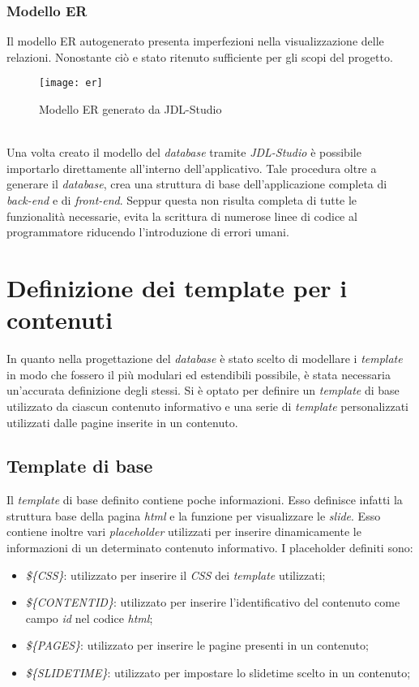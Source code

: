 \subsubsection{Modello ER}
Il modello ER autogenerato presenta imperfezioni nella visualizzazione delle relazioni. Nonostante ciò e stato ritenuto sufficiente per gli scopi del progetto.
\begin{figure}[h]
    \begin{center}
    \texttt{[image: er]}
    \caption{Modello ER generato da JDL-Studio}
    \label{fig:figure19}
    \end{center}
\end{figure}
\\Una volta creato il modello del \textit{database} tramite \textit{JDL-Studio} è possibile importarlo direttamente all'interno dell'applicativo.
Tale procedura oltre a generare il \textit{database}, crea una struttura di base dell'applicazione completa di \textit{back-end} e di \textit{front-end}. Seppur questa non risulta completa di tutte le funzionalità necessarie, evita la scrittura di numerose linee di codice al programmatore riducendo l'introduzione di errori umani.
\section{Definizione dei template per i contenuti}
In quanto nella progettazione del \textit{database} è stato scelto di modellare i \textit{template} in modo che fossero il più modulari ed estendibili possibile, è stata necessaria un'accurata definizione degli stessi. Si è optato per definire un \textit{template} di base utilizzato da ciascun contenuto informativo e una serie di \textit{template} personalizzati utilizzati dalle pagine inserite in un contenuto.
\subsection{Template di base}
Il \textit{template} di base definito contiene poche informazioni. Esso definisce infatti la struttura base della pagina \textit{html} e la funzione per visualizzare le \textit{slide}. Esso contiene inoltre vari \textit{placeholder} utilizzati per inserire dinamicamente le informazioni di un determinato contenuto informativo.
I placeholder definiti sono: 
\begin{itemize}
    \item \textit{\$\{CSS\}}: utilizzato per inserire il \textit{CSS} dei \textit{template} utilizzati;
    \item \textit{\$\{CONTENTID\}}: utilizzato per inserire l’identificativo del contenuto come campo \textit{id} nel codice \textit{html};
    \item \textit{\$\{PAGES\}}: utilizzato per inserire le pagine presenti in un contenuto;
    \item \textit{\$\{SLIDETIME\}}: utilizzato per impostare lo slidetime scelto in un contenuto;
\end{itemize}
